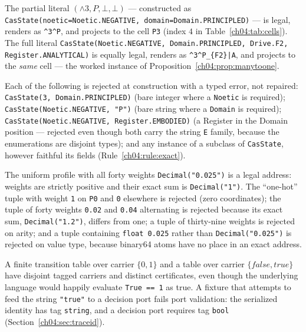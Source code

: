\begin{example}\label{ch04:ex:legal}
The partial literal $({\wedge}3, P, \bot, \bot)$ --- constructed as
\texttt{CasState(noetic=Noetic.NEGATIVE, domain=Domain.PRINCIPLED)} ---
is legal, renders as \texttt{\^{}3\^{}P}, and projects to the cell
\texttt{P3} (index $4$ in Table~\ref{ch04:tab:cells}). The full literal
\texttt{CasState(Noetic.NEGATIVE, Domain.PRINCIPLED, Drive.F2,
Register.ANALYTICAL)} is equally legal, renders as
\texttt{\^{}3\^{}P\_\{F2\}|A}, and projects to the \emph{same} cell ---
the worked instance of Proposition~\ref{ch04:prop:manytoone}.
\end{example}

\begin{example}\label{ch04:ex:illegal}
Each of the following is rejected at construction with a typed error, not
repaired: \texttt{CasState(3, Domain.PRINCIPLED)} (bare integer where a
\texttt{Noetic} is required); \texttt{CasState(Noetic.NEGATIVE, "P")}
(bare string where a \texttt{Domain} is required);
\texttt{CasState(Noetic.NEGATIVE, Register.EMBODIED)} (a Register in the
Domain position --- rejected even though both carry the string \texttt{E}
family, because the enumerations are disjoint types); and any instance of
a subclass of \texttt{CasState}, however faithful its fields
(Rule~\ref{ch04:rule:exact}).
\end{example}

\begin{example}\label{ch04:ex:simplexreject}
The uniform profile with all forty weights \texttt{Decimal("0.025")} is a
legal address: weights are strictly positive and their exact sum is
\texttt{Decimal("1")}. The ``one-hot'' tuple with weight \texttt{1} on
\texttt{P0} and \texttt{0} elsewhere is rejected (zero coordinates); the
tuple of forty weights \texttt{0.02} and \texttt{0.04} alternating is
rejected because its exact sum, \texttt{Decimal("1.2")}, differs from
one; a tuple of thirty-nine
weights is rejected on arity; and a tuple containing
\texttt{float 0.025} rather than \texttt{Decimal("0.025")} is rejected on
value type, because binary64 atoms have no place in an exact address.
\end{example}

\begin{example}\label{ch04:ex:pun}
A finite transition table over carrier $\{0, 1\}$ and a table over carrier
$\{\mathit{false}, \mathit{true}\}$ have disjoint tagged carriers and
distinct certificates, even though the underlying language would happily
evaluate \texttt{True == 1} as true. A fixture that attempts to feed the
string \texttt{"true"} to a decision port fails port validation: the
serialized identity has tag \texttt{string}, and a decision port requires
tag \texttt{bool} (Section~\ref{ch04:sec:traceid}).
\end{example}

